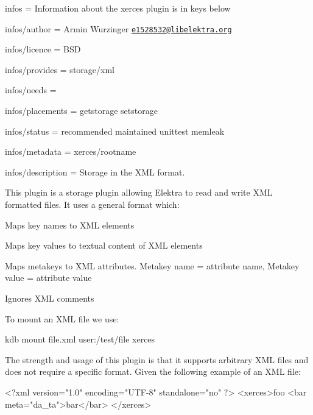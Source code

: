 
\begin{DoxyItemize}
\item infos = Information about the xerces plugin is in keys below
\item infos/author = Armin Wurzinger \href{mailto:e1528532@libelektra.org}{\tt e1528532@libelektra.\+org}
\item infos/licence = B\+SD
\item infos/provides = storage/xml
\item infos/needs =
\item infos/placements = getstorage setstorage
\item infos/status = recommended maintained unittest memleak
\item infos/metadata = xerces/rootname
\item infos/description = Storage in the X\+ML format.
\end{DoxyItemize}

This plugin is a storage plugin allowing Elektra to read and write X\+ML formatted files. It uses a general format which\+:


\begin{DoxyItemize}
\item Maps key names to X\+ML elements
\item Maps key values to textual content of X\+ML elements
\item Maps metakeys to X\+ML attributes. Metakey name = attribute name, Metakey value = attribute value
\item Ignores X\+ML comments
\end{DoxyItemize}

To mount an X\+ML file we use\+:


\begin{DoxyCode}
kdb mount file.xml user:/test/file xerces
\end{DoxyCode}


The strength and usage of this plugin is that it supports arbitrary X\+ML files and does not require a specific format. Given the following example of an X\+ML file\+:


\begin{DoxyCode}
<?\textcolor{keyword}{xml} \textcolor{keyword}{version}=\textcolor{stringliteral}{"1.0"} \textcolor{keyword}{encoding}=\textcolor{stringliteral}{"UTF-8"} \textcolor{keyword}{standalone}=\textcolor{stringliteral}{"no"} ?>
<\textcolor{keywordtype}{xerces}>\textcolor{keyword}{foo}
  <\textcolor{keywordtype}{bar} \textcolor{keyword}{meta}=\textcolor{stringliteral}{"da\_ta"}>\textcolor{keyword}{bar}</\textcolor{keywordtype}{bar}>
</\textcolor{keywordtype}{xerces}>
\end{DoxyCode}


